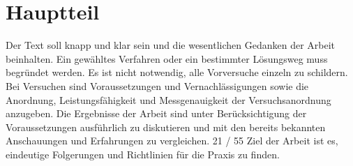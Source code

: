 
\chapter{Hauptteil}

Der Text soll knapp und klar sein und die wesentlichen Gedanken der Arbeit beinhalten. Ein gewähltes Verfahren
oder ein bestimmter Lösungsweg muss begründet werden. Es ist nicht notwendig, alle Vorversuche
einzeln zu schildern. Bei Versuchen sind Voraussetzungen und Vernachlässigungen sowie die Anordnung,
Leistungsfähigkeit und Messgenauigkeit der Versuchsanordnung anzugeben.
Die Ergebnisse der Arbeit sind unter Berücksichtigung der Voraussetzungen ausführlich zu diskutieren und
mit den bereits bekannten Anschauungen und Erfahrungen zu vergleichen.
21 / 55
Ziel der Arbeit ist es, eindeutige Folgerungen und Richtlinien für die Praxis zu finden.
